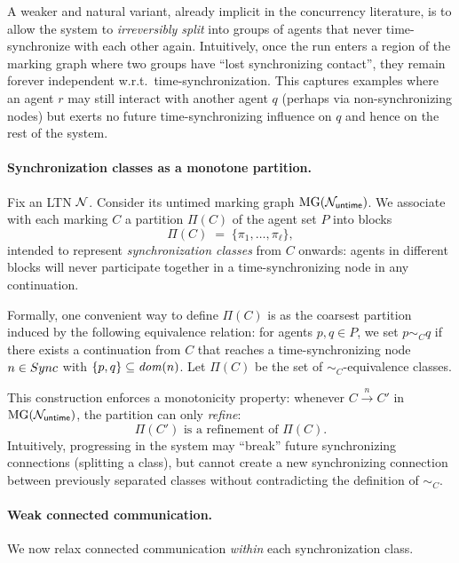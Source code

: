 A weaker and natural variant, already implicit in the concurrency literature, is to allow the system to \emph{irreversibly split} into groups of agents that never time-synchronize with each other again. Intuitively, once the run enters a region of the marking graph where two groups have ``lost synchronizing contact'', they remain forever independent w.r.t.\ time-synchronization. This captures examples where an agent $r$ may still interact with another agent $q$ (perhaps via non-synchronizing nodes) but exerts no future time-synchronizing influence on $q$ and hence on the rest of the system.

\paragraph{Synchronization classes as a monotone partition.}
Fix an LTN $\mathcal{N}$. Consider its untimed marking graph $\operatorname{MG}(\mathcal{N}_{\mathsf{untime}})$.
We associate with each marking $C$ a partition $\Pi(C)$ of the agent set $P$ into blocks
\[
\Pi(C) \;=\; \{\pi_1,\ldots,\pi_\ell\},
\]
intended to represent \emph{synchronization classes} from $C$ onwards: agents in different blocks will never participate together in a time-synchronizing node in any continuation.

Formally, one convenient way to define $\Pi(C)$ is as the coarsest partition induced by the following equivalence relation: for agents $p,q\in P$,
we set $p \sim_C q$ if there exists a continuation from $C$ that reaches a time-synchronizing node $n\in Sync$ with $\{p,q\}\subseteq \mathit{dom}(n)$.
Let $\Pi(C)$ be the set of $\sim_C$-equivalence classes.

This construction enforces a monotonicity property:
whenever $C \xrightarrow{n} C'$ in $\operatorname{MG}(\mathcal{N}_{\mathsf{untime}})$, the partition can only \emph{refine}:
\[
\Pi(C') \text{ is a refinement of } \Pi(C).
\]
Intuitively, progressing in the system may ``break'' future synchronizing connections (splitting a class),
but cannot create a new synchronizing connection between previously separated classes without contradicting the definition of $\sim_C$.

\paragraph{Weak connected communication.}
We now relax connected communication \emph{within} each synchronization class.

